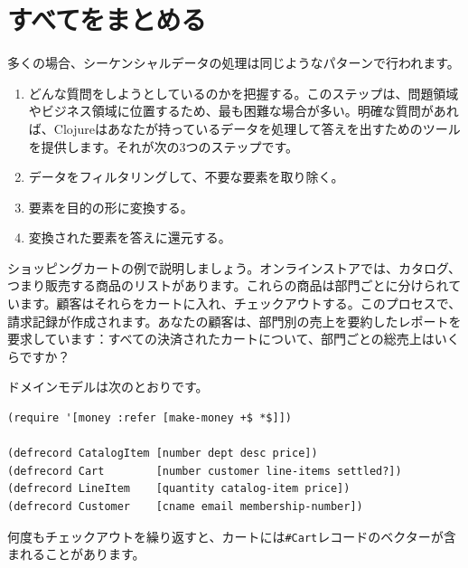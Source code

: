 \section{すべてをまとめる}

多くの場合、シーケンシャルデータの処理は同じようなパターンで行われます。

\begin{enumerate}
\item  どんな質問をしようとしているのかを把握する。このステップは、問題領域やビジネス領域に位置するため、最も困難な場合が多い。明確な質問があれば、Clojureはあなたが持っているデータを処理して答えを出すためのツールを提供します。それが次の3つのステップです。
\item  データをフィルタリングして、不要な要素を取り除く。
\item 要素を目的の形に変換する。
\item 変換された要素を答えに還元する。
\end{enumerate}


ショッピングカートの例で説明しましょう。オンラインストアでは、カタログ、つまり販売する商品のリストがあります。これらの商品は部門ごとに分けられています。顧客はそれらをカートに入れ、チェックアウトする。このプロセスで、請求記録が作成されます。あなたの顧客は、部門別の売上を要約したレポートを要求しています：すべての決済されたカートについて、部門ごとの総売上はいくらですか？

ドメインモデルは次のとおりです。


\begin{lstlisting}[numbers=none]
(require '[money :refer [make-money +$ *$]])

(defrecord CatalogItem [number dept desc price])
(defrecord Cart        [number customer line-items settled?])
(defrecord LineItem    [quantity catalog-item price])
(defrecord Customer    [cname email membership-number])
\end{lstlisting}

何度もチェックアウトを繰り返すと、カートには\texttt{\#Cart}レコードのベクターが含まれることがあります。


